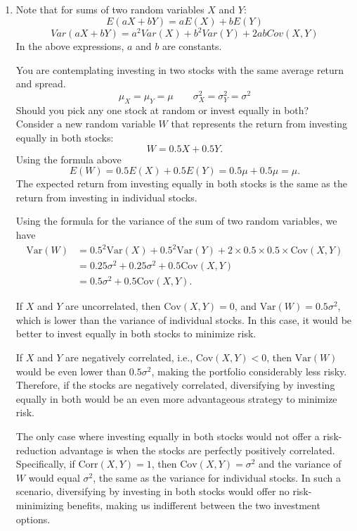 \documentclass{./../../Latex/handout}
\begin{document}
\begin{enumerate}
\item Note that for sums of two random variables $X$ and $Y$:
$$ E(a X + b Y ) = a E(X) + b E(Y)$$
$$ Var(a X + b Y ) = a^2 Var(X) + b^2 Var(Y) + 2abCov(X,Y)$$
In the above expressions, $a$ and $b$ are constants. 

You are contemplating investing in two stocks with the same average return and spread.  
$$ \mu_X = \mu_Y = \mu  \quad \quad \sigma^2_X = \sigma^2_Y = \sigma^2 $$
Should you pick any one stock at random or invest equally in both? \\

Consider a new random variable \(W\) that represents the return from investing equally in both stocks:
\[
W = 0.5X + 0.5Y.
\]
Using the formula above
\[
E(W) = 0.5E(X) + 0.5E(Y) = 0.5\mu + 0.5\mu = \mu.
\]
The expected return from investing equally in both stocks is the same as the return from investing in individual stocks.

Using the formula for the variance of the sum of two random variables, we have
\[
\begin{aligned}
\text{Var}(W) &= 0.5^2\text{Var}(X) + 0.5^2\text{Var}(Y) + 2 \times 0.5 \times 0.5 \times \text{Cov}(X,Y) \\
&= 0.25\sigma^2 + 0.25\sigma^2 + 0.5  \text{Cov}(X,Y) \\
&= 0.5\sigma^2 + 0.5 \text{Cov}(X,Y).
\end{aligned}
\]

If \(X\) and \(Y\) are uncorrelated, then \(\text{Cov}(X,Y) = 0\), and \(\text{Var}(W) = 0.5\sigma^2\), which is lower than the variance of individual stocks. In this case, it would be better to invest equally in both stocks to minimize risk.

If \(X\) and \(Y\) are negatively correlated, i.e., \(\text{Cov}(X, Y) < 0\), then \(\text{Var}(W)\) would be even lower than \(0.5\sigma^2\), making the portfolio considerably less risky. Therefore, if the stocks are negatively correlated, diversifying by investing equally in both would be an even more advantageous strategy to minimize risk.

The only case where investing equally in both stocks would not offer a risk-reduction advantage is when the stocks are perfectly positively correlated. Specifically, if \( \text{Corr}(X, Y) =1\), then \( \text{Cov}(X, Y) = \sigma^2 \) and the variance of \( W \) would equal \( \sigma^2 \), the same as the variance for individual stocks. In such a scenario, diversifying by investing in both stocks would offer no risk-minimizing benefits, making us indifferent between the two investment options.



\end{enumerate}
\end{document}
